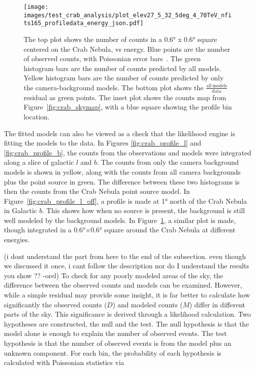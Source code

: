   \begin{figure}[p]
    \centering
    \texttt{[image: images/test\_crab\_analysis/plot\_elev27\_5\_32\_5deg\_4\_70TeV\_nfits165\_profiledata\_energy\_json.pdf]}
    \caption[Crab Nebula Profile in Energy]
    {
      The top plot shows the number of counts in a \ang{0.6} x \ang{0.6} square centered on the Crab Nebula, vs energy.
      Blue points are the number of observed counts, with Poissonian error bars~\cite{poissonfrequentistinterval}.
      The green histogram bars are the number of counts predicted by all models.
      Yellow histogram bars are the number of counts predicted by only the camera-background models.
      The bottom plot shows the $\frac{\mathrm{all\:models}}{\mathrm{data}}$ residual as green points.
      The inset plot shows the counts map from Figure~\ref{fig:crab_skymap}, with a blue square showing the profile bin location.
    }
    \label{fig:crab_profile_energy}
  \end{figure}
    
  The fitted models can also be viewed as a check that the likelihood engine is fitting the models to the data.
  In Figures \ref{fig:crab_profile_l} and \ref{fig:crab_profile_b}, the counts from the observations and models were integrated along a slice of galactic $l$ and $b$.
  The counts from only the camera background models is shown in yellow, along with the counts from all camera backgrounds plus the point source in green.
  The difference between these two histograms is then the counts from the Crab Nebula point source model.
  In Figure~\ref{fig:crab_profile_l_off}, a profile is made at \ang{1} north of the Crab Nebula in Galactic $b$.
  This shows how when no source is present, the background is still well modeled by the background models.
  In Figure~\ref{fig:crab_profile_energy}, a similar plot is made, though integrated in a \ang{0.6}$\times$\ang{0.6} square around the Crab Nebula at different energies.
  
  {\color{red}(i dont understand the part from here to the end of the subsection.  even though we discussed it once, i cant follow the description nor do I understand the results you show ?? -orel)}
  To check for any poorly modeled areas of the sky, the difference between the observed counts and models can be examined.
  However, while a simple residual may provide some insight, it is far better to calculate how significantly the observed counts ($D$) and modeled counts ($M$) differ in different parts of the sky.
  This significance is derived through a likelihood calculation.
  Two hypotheses are constructed, the null and the test.
  The null hypothesis is that the model alone is enough to explain the number of observed events.
  The test hypothesis is that the number of observed events is from the model plus an unknown component.
  For each bin, the probability of each hypothesis is calculated with Poissonian statistics via

